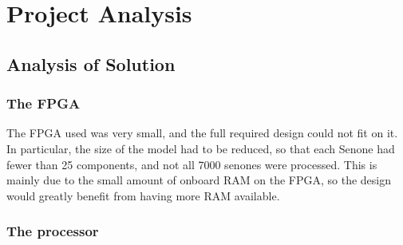 \chapter{Project Analysis} %
\label{cha:project_management}

\section{Analysis of Solution} %
\label{sec:analysis_of_solution}

	\subsection{The FPGA} %
	\label{sub:analysis_the_fpga}
		The FPGA used was very small, and the full required design could not fit on it.  In particular, the size of the model had to be reduced, so that each Senone had fewer than 25 components, and not all 7000 senones were processed.  This is mainly due to the small amount of onboard RAM on the FPGA, so the design would greatly benefit from having more RAM available.




	\subsection{The processor} %
	\label{sub:analysis_the_processor}



